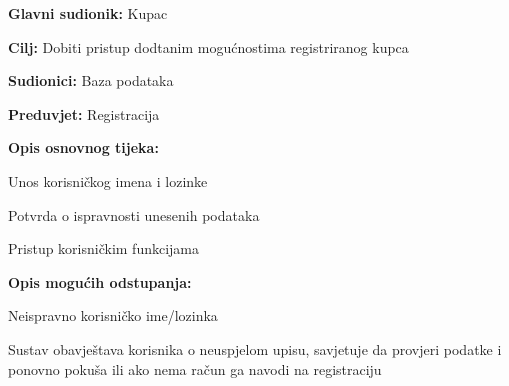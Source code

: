 					\noindent {}
					\begin{packed_item}
						
						\item \textbf{Glavni sudionik: } Kupac
						\item  \textbf{Cilj:} Dobiti pristup dodtanim mogućnostima registriranog kupca
						\item  \textbf{Sudionici:} Baza podataka
						\item  \textbf{Preduvjet:} Registracija
						\item  \textbf{Opis osnovnog tijeka:} 
						
						\item[] \begin{packed_enum}
							
							\item Unos korisničkog imena i lozinke
							\item Potvrda o ispravnosti unesenih podataka
							\item Pristup korisničkim funkcijama
						\end{packed_enum}
						
						\item  \textbf{Opis mogućih odstupanja:}
						
						\item[] \begin{packed_item}
							
							\item[2.a] Neispravno korisničko ime/lozinka
							\item[] \begin{packed_enum}
								
								\item Sustav obavještava korisnika o neuspjelom upisu, savjetuje da provjeri podatke i ponovno pokuša ili ako nema račun ga navodi na registraciju
								
							\end{packed_enum}
							
						\end{packed_item}
					\end{packed_item}
					
